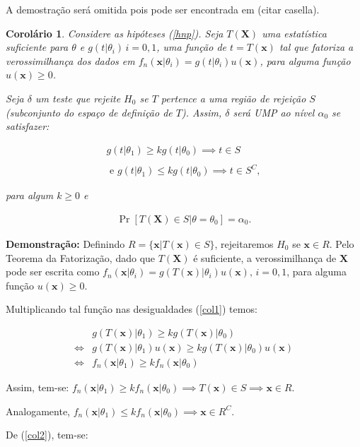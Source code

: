 \documentclass[a4paper,10pt, notitlepage]{report}
\newtheorem{col}{Corolário}
\newcommand{\pow}{^}%
\newcommand{\pr}{\operatorname{Pr}} %
\newcommand{\bX}{\boldsymbol{X}} %
\newcommand{\bx}{\boldsymbol{x}} %
\begin{document}
	A demostração será omitida pois pode ser encontrada em (citar casella).
	
	\begin{col}
		\label{colnp}
		Considere as hipóteses (\ref{hnp}). Seja $T(\bX)$ uma estatística suficiente para $\theta$ e $g(t|\theta_i)\,i=0,1$, uma função de $t=T(\bx)$ tal que fatoriza a verossimilhança dos dados em $f_n(\bx|\theta_i)=g(t|\theta_i)u(\bx)$, para alguma função $u(\bx)\geq0$.
		
		Seja $\delta$ um teste que rejeite $H_0$ se $T$ pertence a uma região de rejeição $S$ (subconjunto do espaço de definição de $T$). Assim, $\delta$ será UMP ao nível $\alpha_0$ se satisfazer:
		
		\begin{align}
		\label{col1}
		 g(t|\theta_1)\geq  kg(t|\theta_0)\implies t\in S\nonumber\\ \\\text{ e }g(t|\theta_1)\leq kg(t|\theta_0)\implies t\in S\pow C,\nonumber
		\end{align}
		
		para algum $k\geq0$ e 
		
		\begin{align}
		\label{col2}
		\pr[T(\bX)\in S|\theta = \theta_0]=\alpha_0.
		\end{align}
		
	\end{col}
	\textbf{Demonstração:} Definindo $R=\{\bx|T(\bx)\in S\}$, rejeitaremos $H_0$ se $\bx \in R$. Pelo Teorema da Fatorização, dado que $T(\bX)$ é suficiente, a verossimilhança de $\bX$ pode ser escrita como $f_n(\bx|\theta_i)=g(T(\bx)|\theta_i)u(\bx),\,i=0,1$, para alguma função $u(\bx)\geq 0$.
	
	Multiplicando tal função nas desigualdades (\ref{col1}) temos:
	
	\begin{align*}
		&g(T(\bx)|\theta_1)\geq kg(T(\bx)|\theta_0)\\
		\Leftrightarrow&
		g(T(\bx)|\theta_1)u(\bx)\geq kg(T(\bx)|\theta_0)u(\bx)\\
		\Leftrightarrow&f_n(\bx|\theta_1)\geq kf_n(\bx|\theta_0)
	\end{align*}
	
	Assim, tem-se: $f_n(\bx|\theta_1)\geq kf_n(\bx|\theta_0)\implies T(\bx)\in S\implies \bx \in R$.
	
	Analogamente, $f_n(\bx|\theta_1)\leq kf_n(\bx|\theta_0)\implies \bx \in R\pow C$.
	
	
	De (\ref{col2}), tem-se:
	
\end{document}
